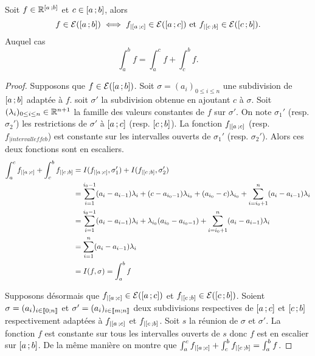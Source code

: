 \begin{prop}
  Soit $f \in \mathbb{R}^{\left[ a \, ;  b \right]}$ et $c \in \left[ a \, ;  b \right]$, alors
  \begin{equation}
    f \in \mathcal{E}(\left[ a \, ;  b \right]) \iff f_{|\left[ a \, ;  c \right]} \in \mathcal{E}(\left[ a \, ;  c \right]) \text{~et~} f_{|\left[ c \, ;  b \right]} \in \mathcal{E}(\left[ c \, ;  b \right]).
  \end{equation}
  Auquel cas
  \begin{equation}
    \int_a^b f = \int_a^c f +\int_c^b f.
  \end{equation}
\end{prop}
\begin{proof}
  Supposons que $f \in \mathcal{E}(\left[ a \, ;  b \right])$. Soit $\sigma=(a_i)_{0\leq i \leq n}$ une subdivision de $\left[ a \, ;  b \right]$ adaptée à $f$. soit $\sigma'$ la subdivision obtenue en ajoutant $c$ à $\sigma$. Soit $(\lambda_i)_{0 \leq i \leq n}\in\mathbb{R}^{n+1}$ la famille des valeurs constantes de $f$ sur $\sigma'$. On note $\sigma_1'$ (resp. $\sigma_2'$) les restrictions de $\sigma'$ à $\left[ a \, ;  c \right]$ (resp. $\left[ c \, ;  b \right]$). La fonction $f_{|\left[ a \, ;  c \right]}$ (resp. $f_{|intervalleff{c}{b}}$) est constante sur les intervalles ouverts de $\sigma_1'$ (resp. $\sigma_2'$). Alors ces deux fonctions sont en escaliers.
  \begin{align}
    \int_a^c f_{|\left[ a \, ;  c \right]} +\int_c^b f_{|\left[ c \, ;  b \right]} &= I(f_{|\left[ a \, ;  c \right]},\sigma_1')+I(f_{|\left[ c \, ;  b \right]},\sigma_2') \\
&=\sum_{i=1}^{i_0-1} (a_i-a_{i-1})\lambda_i + (c-a_{i_0-1})\lambda_{i_0} + (a_{i_0}-c)\lambda_{i_0} + \sum_{i=i_0+1}^{n} (a_i-a_{i-1})\lambda_i \\
&= \sum_{i=1}^{i_0-1} (a_i-a_{i-1})\lambda_i + \lambda_{i_0}(a_{i_0}-a_{i_0-1}) +\sum_{i=i_0+1}^{n} (a_i-a_{i-1})\lambda_i\\
&=\sum_{i=1}^{n} (a_i-a_{i-1})\lambda_i\\
&=I(f,\sigma)=\int_a^bf
  \end{align}

  Supposons désormais que $f_{|\left[ a \, ;  c \right]} \in \mathcal{E}(\left[ a \, ;  c \right])$ et $ f_{|\left[ c \, ;  b \right]} \in \mathcal{E}(\left[ c \, ;  b \right])$. Soient $\sigma=(a_i)_{i \in \mathopen{\llbracket}0\mathclose{}\mathpunct{};n\mathclose{\rrbracket}}$ et $\sigma'=(a_i)_{i \in \mathopen{\llbracket}m\mathclose{}\mathpunct{};n\mathclose{\rrbracket}}$ deux subdivisions respectives de $\left[ a \, ;  c \right]$ et $\left[ c \, ;  b \right]$ respectivement adaptées à  $f_{|\left[ a \, ;  c \right]}$ et $ f_{|\left[ c \, ;  b \right]}$. Soit $s$ la réunion de $\sigma$ et $\sigma'$. La fonction $f$ est constante sur tous les intervalles ouverts de $s$ donc $f$ est en escalier sur $\left[ a \, ;  b \right]$. De la même manière on montre que 
$\int_a^c f_{|\left[ a \, ;  c \right]} +\int_c^b f_{|\left[ c \, ;  b \right]} = \int_a^b f$.
\end{proof}

